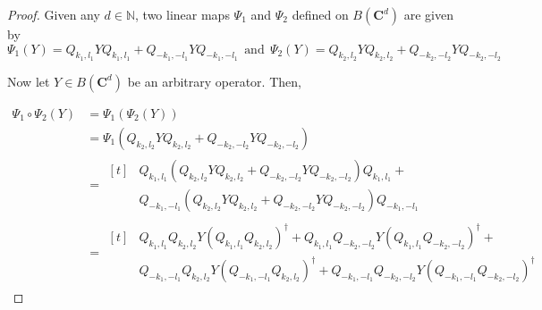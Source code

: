 \documentclass[12pt]{amsart}
\numberwithin{equation}{section}
\begin{document}
\begin{proof}

Given any $d \in \mathbb{N}$, two linear maps $\Psi_1$ and $\Psi_2$ defined on $B\left(\mathbf{C}^d\right)$ are given by
    \[\Psi_1 (Y)=Q_{k_1,l_1} Y Q_{k_1,l_1} + Q_{-k_1,-l_1} Y Q_{-k_1,-l_1} ~~\text{and}~~\Psi_2 (Y)=Q_{k_2,l_2} Y Q_{k_2,l_2} + Q_{-k_2,-l_2} Y Q_{-k_2,-l_2}\]

Now let $Y \in B\left(\mathbf{C}^d\right)$ be an arbitrary operator. Then,

    \begin{equation} \label{W}
        \begin{split}
\Psi_1 \circ \Psi_2  (Y)&=\Psi_1 \left( \Psi_2 (Y)\right)
\\[1ex]
 &=\Psi_1 \left( Q_{k_2,l_2} Y Q_{k_2,l_2} + Q_{-k_2,-l_2} Y Q_{-k_2,-l_2} \right)
\\[1ex]
&=\begin{aligned}[t] 
 &Q_{k_1,l_1}\left(Q_{k_2,l_2} Y Q_{k_2,l_2} + Q_{-k_2,-l_2} Y Q_{-k_2,-l_2}  \right)Q_{k_1,l_1} + \\
& Q_{-k_1,-l_1} \left( Q_{k_2,l_2} Y Q_{k_2,l_2} + Q_{-k_2,-l_2} Y Q_{-k_2,-l_2}\right) Q_{-k_1,-l_1}
\end{aligned}
\\[1ex]
&=\begin{aligned}[t]
&Q_{k_1,l_1} Q_{k_2,l_2} Y \left(Q_{k_1,l_1} Q_{k_2,l_2} \right)^{\dagger}+ Q_{k_1,l_1} Q_{-k_2,-l_2} Y \left(Q_{k_1,l_1} Q_{-k_2,-l_2} \right)^{\dagger}+\\
 &Q_{-k_1,-l_1} Q_{k_2,l_2} Y \left(Q_{-k_1,-l_1} Q_{k_2,l_2} \right)^{\dagger} + Q_{-k_1,-l_1} Q_{-k_2,-l_2} Y \left(Q_{-k_1,-l_1} Q_{-k_2,-l_2} \right)^{\dagger}
       \end{aligned}
        \end{split}
    \end{equation}
    
    
    
    
    

\end{proof}
\end{document}
